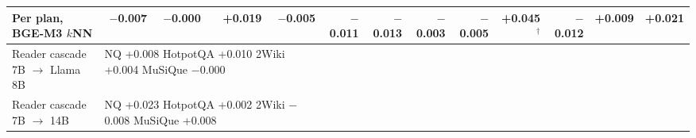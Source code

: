 \begin{table}[t]
\begin{tabular}{lrrrrrrrrrrrr}
Per plan, BGE-M3 $k$NN & $-$0.007 & $-$0.000 & +0.019 & $-$0.005 & $-$0.011 & $-$0.013 & $-$0.003 & $-$0.005 & +0.045$^\dagger$ & $-$0.012 & +0.009 & +0.021 \\
\midrule
Reader cascade 7B $\rightarrow$ Llama 8B & \multicolumn{4}{l}{NQ +0.008 \; HotpotQA +0.010 \; 2Wiki +0.004 \; MuSiQue $-$0.000} &  &  &  &  &  &  &  &  \\
Reader cascade 7B $\rightarrow$ 14B & \multicolumn{4}{l}{NQ +0.023 \; HotpotQA +0.002 \; 2Wiki $-$0.008 \; MuSiQue +0.008} &  &  &  &  &  &  &  &  \\
\bottomrule
\end{tabular}
\end{table}
